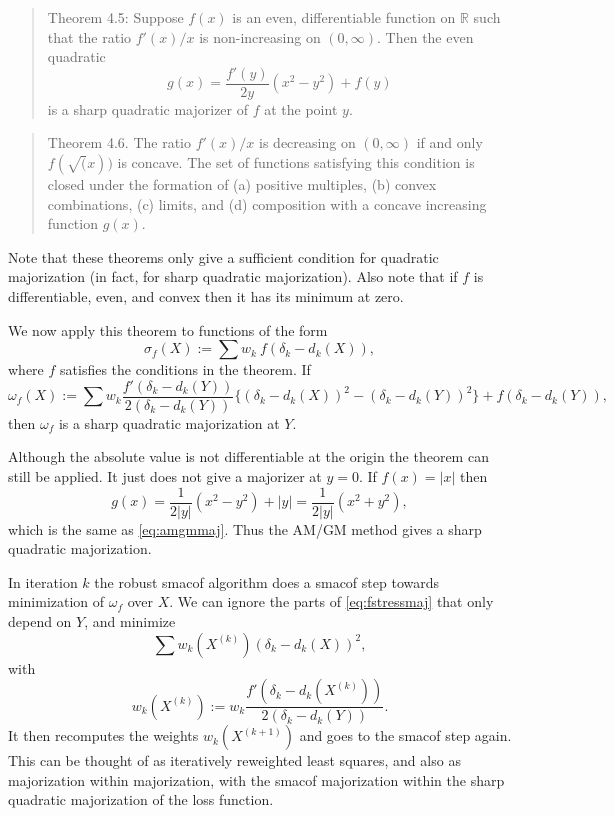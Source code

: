 \documentclass[
  12pt,
  letterpaper,
  DIV=11,
  numbers=noendperiod]{scrartcl}
\begin{document}
\begin{quote}
Theorem 4.5: Suppose \(f(x)\) is an even, differentiable function on
\(\mathbb{R}\) such that the ratio \(f'(x)/x\) is non-increasing on
\((0,\infty)\). Then the even quadratic \begin{equation}
g(x)=\frac{f'(y)}{2y}(x^2-y^2)+f(y)\label{eq:sharp}
\end{equation} is a sharp quadratic majorizer of \(f\) at the point
\(y\).
\end{quote}

\begin{quote}
Theorem 4.6. The ratio \(f'(x)/x\) is decreasing on \((0,\infty)\) if
and only \(f(\sqrt(x))\) is concave. The set of functions satisfying
this condition is closed under the formation of (a) positive multiples,
(b) convex combinations, (c) limits, and (d) composition with a concave
increasing function \(g(x)\).
\end{quote}

Note that these theorems only give a sufficient condition for quadratic
majorization (in fact, for sharp quadratic majorization). Also note that
if \(f\) is differentiable, even, and convex then it has its minimum at
zero.

We now apply this theorem to functions of the form \begin{equation}
\sigma_f(X):=\sum w_k\ f(\delta_k-d_k(X)),\label{eq:fstressdef}
\end{equation} where \(f\) satisfies the conditions in the theorem. If
\begin{equation}
\omega_f(X):=\sum w_k\frac{f'(\delta_k-d_k(Y))}{2(\delta_k-d_k(Y))}\{(\delta_k-d_k(X))^2-(\delta_k-d_k(Y))^2\}+f(\delta_k-d_k(Y)),\label{eq:fstressmaj}
\end{equation} then \(\omega_f\) is a sharp quadratic majorization at
\(Y\).

Although the absolute value is not differentiable at the origin the
theorem can still be applied. It just does not give a majorizer at
\(y=0\). If \(f(x)=|x|\) then \begin{equation}
g(x)=\frac{1}{2|y|}(x^2-y^2)+|y|=\frac{1}{2|y|}(x^2+y^2),\label{eq:abssharp}
\end{equation} which is the same as \eqref{eq:amgmmaj}. Thus the AM/GM
method gives a sharp quadratic majorization.

In iteration \(k\) the robust smacof algorithm does a smacof step
towards minimization of \(\omega_f\) over \(X\). We can ignore the parts
of \eqref{eq:fstressmaj} that only depend on \(Y\), and minimize
\begin{equation}
\sum w_k(X^{(k)})(\delta_k-d_k(X))^2,\label{eq:fstressaux}
\end{equation} with \begin{equation}
w_k(X^{(k)}):=w_k\frac{f'(\delta_k-d_k(X^{(k)}))}{2(\delta_k-d_k(Y))}.\label{eq:wkdef}
\end{equation} It then recomputes the weights \(w_k(X^{(k+1)})\) and
goes to the smacof step again. This can be thought of as iteratively
reweighted least squares, and also as majorization within majorization,
with the smacof majorization within the sharp quadratic majorization of
the loss function.
\end{document}
